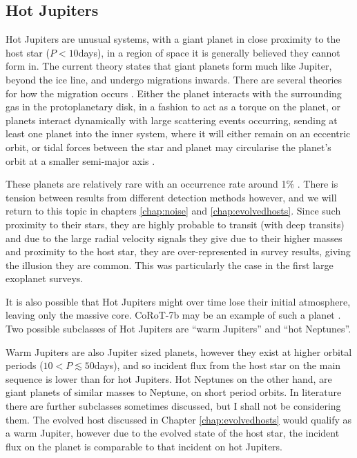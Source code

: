 \subsection{Hot Jupiters}
Hot Jupiters are unusual systems, with a giant planet in close proximity to the host star ($P<10$days), in a region of space it is generally believed they cannot form in. The current theory states that giant planets form much like Jupiter, beyond the ice line, and undergo migrations inwards. There are several theories for how the migration occurs \citep{2013Baruteau}. Either the planet interacts with the surrounding gas in the protoplanetary disk, in a fashion to act as a torque on the planet, or planets interact dynamically with large scattering events occurring, sending at least one planet into the inner system, where it will either remain on an eccentric orbit, or tidal forces between the star and planet may circularise the planet's orbit at a smaller semi-major axis \citep{2015Petrovich}. 

These planets are relatively rare with an occurrence rate around 1\% \citep{Johnson2010,Fressin2013}. There is tension between results from different detection methods however, and we will return to this topic in chapters \ref{chap:noise} and \ref{chap:evolvedhosts}. Since such proximity to their stars, they are highly probable to transit (with deep transits) and due to the large radial velocity signals they give due to their higher masses and proximity to the host star, they are over-represented in survey results, giving the illusion they are common. This was particularly the case in the first large exoplanet surveys. 

It is also possible that Hot Jupiters might over time lose their initial atmosphere, leaving only the massive core. CoRoT-7b may be an example of such a planet \citep{2011Leitzinger,2015Ehrenreich}. Two possible subclasses of Hot Jupiters are ``warm Jupiters'' and ``hot Neptunes''.

Warm Jupiters are also Jupiter sized planets, however they exist at higher orbital periods ($10<P\lesssim 50$days), and so incident flux from the host star on the main sequence is lower than for hot Jupiters. Hot Neptunes on the other hand, are giant planets of similar masses to Neptune, on short period orbits. In literature there are further subclasses sometimes discussed, but I shall not be considering them. The evolved host discussed in Chapter \ref{chap:evolvedhosts} would qualify as a warm Jupiter, however due to the evolved state of the host star, the incident flux on the planet is comparable to that incident on hot Jupiters. 

